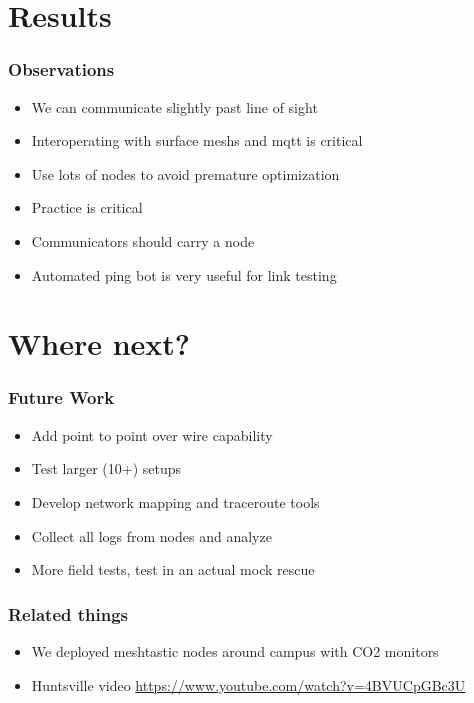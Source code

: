 \documentclass{beamer}
\begin{document}
\section{Results}

\begin{frame}

\frametitle{Observations}

\begin{itemize}
\item We can communicate slightly past line of sight
\item Interoperating with surface meshs and mqtt is critical
\item Use lots of nodes to avoid premature optimization
\item Practice is critical
\item Communicators should carry a node
\item Automated ping bot is very useful for link testing
\end{itemize}

\end{frame}

\section{Where next?}

\begin{frame}
\frametitle{Future Work}

\begin{itemize}
\item Add point to point over wire capability
\item Test larger (10+) setups
\item Develop network mapping and traceroute tools
\item Collect all logs from nodes and analyze
\item More field tests, test in an actual mock rescue
\end{itemize}

\end{frame}

\begin{frame}
\frametitle{Related things}

\begin{itemize}
\item We deployed meshtastic nodes around campus with CO2 monitors
\item Huntsville video \tiny\url{https://www.youtube.com/watch?v=4BVUCpGBc3U}
\end{itemize}

\end{frame}
\end{document}
